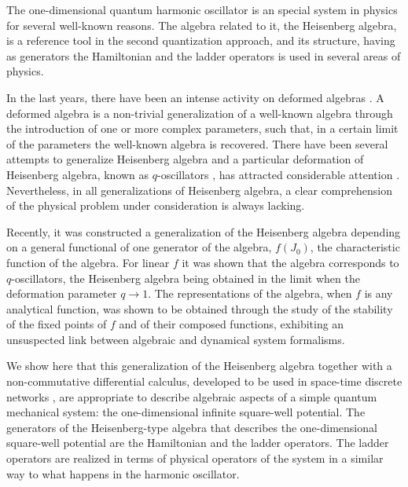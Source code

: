 \documentclass[a4paper,12pt]{article}
\begin{document}
\newpage



The one-dimensional quantum harmonic oscillator is an
special system in physics for several well-known reasons. 
The algebra related to it, the Heisenberg algebra, is a 
reference tool in the second quantization approach, and 
its structure, having as generators the Hamiltonian and  
the ladder operators is used in several areas of
physics. 

In the last years, there have been an intense activity
on deformed algebras \cite{defalgebras}. A deformed algebra
is a non-trivial generalization of a well-known algebra
through the introduction of one or more complex parameters,
such that, in a certain limit of the parameters the 
well-known algebra is recovered. There have been 
several attempts to generalize Heisenberg algebra and a 
particular deformation of Heisenberg algebra, known as
$q$-oscillators \cite{qoscillators}, has attracted 
considerable attention \cite{qappli,marco1, marco2}. 
Nevertheless, in all generalizations of Heisenberg algebra, 
a clear comprehension of the physical problem under 
consideration is always lacking.

Recently, it was constructed a generalization of 
the Heisenberg algebra depending on a general functional 
of one generator of the algebra, $f(J_0)$, 
\cite{algebra1,algebra2} the characteristic function
of the algebra. For linear $f$ it was shown 
that the algebra corresponds to $q$-oscillators, 
the Heisenberg algebra being obtained in the limit when 
the deformation parameter $q \rightarrow 1$. The 
representations of the algebra, when $f$ is any 
analytical function, was shown to be obtained through
the study of the stability of the fixed points of $f$ and 
of their composed functions, exhibiting an unsuspected 
link between algebraic and dynamical system formalisms.

We show here that this generalization of the Heisenberg
algebra together with a non-commutative differential 
calculus, developed to be used in space-time discrete 
networks \cite{dimakis1,dimakis2,dimakis3}, are 
appropriate to describe algebraic aspects of a simple 
quantum mechanical system: the one-dimensional infinite 
square-well potential. The generators of the 
Heisenberg-type algebra that describes the one-dimensional
square-well potential are the Hamiltonian and the
ladder operators. The ladder operators are realized in 
terms of physical operators of the system in a similar 
way to what happens in the harmonic oscillator. 
\end{document}
